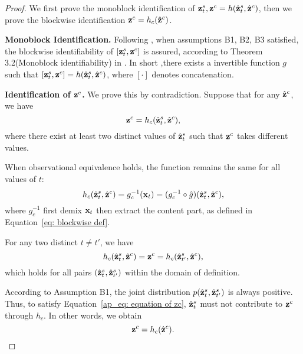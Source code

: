 \begin{proof}

    We first prove the monoblock identification of ${\mathbf{z}}_{t}^s,{\mathbf{z}}^c = h(\hat{{\mathbf{z}}}_{t}^s,\hat{{\mathbf{z}}}^c)$, then we prove the blockwise identification
    ${\mathbf{z}}^c = h_c(\hat{{\mathbf{z}}}^c)$.

    \textbf{Monoblock Identification.} Following \citep{hu2012nonparametric,hu2008instrumental}, when assumptions B1, B2, B3 satisfied, the blockwise identifiability of $[{\mathbf{z}}_{t}^s,{\mathbf{z}}^c]$ is assured, according to Theorem 3.2(Monoblock identifiability) in \citep{fu2025identification}. In short ,there exists a invertible function $g$ such that $[{\mathbf{z}}_{t}^s,{\mathbf{z}}^c] = h(\hat{{\mathbf{z}}}_{t}^s,\hat{{\mathbf{z}}}^c)$, where $[\cdot]$ denotes concatenation.

    \textbf{Identification of ${\mathbf{z}}^c$.}   We prove this by contradiction. Suppose that for any $\hat{{\mathbf{z}}}^c$, we have  
    \begin{equation}
        {\mathbf{z}}^c = h_c(\hat{{\mathbf{z}}}_t^s, \hat{{\mathbf{z}}}^c),
    \end{equation}  
    where there exist at least two distinct values of $\hat{{\mathbf{z}}}_t^s$ such that ${\mathbf{z}}^c$ takes different values.

    
    When observational equivalence holds, the function remains the same for all values of $t$:  
    \begin{equation}
         h_c(\hat{{\mathbf{z}}}_t^s, \hat{{\mathbf{z}}}^c) = g_c^{-1}({\mathbf{x}}_t) = (g_c^{-1} \circ \hat{g})(\hat{{\mathbf{z}}}_t^s, \hat{{\mathbf{z}}}^c),
    \end{equation}  
    where $g_c^{-1}$ first demix ${\mathbf{x}}_t$ then extract the content part, as defined in Equation~\ref{eq: blockwise def}.
    
    For any two distinct $t \neq t'$, we have  
    \begin{equation}
    \label{ap_eq: equation of zc}
          h_c(\hat{{\mathbf{z}}}_{t}^s, \hat{{\mathbf{z}}}^c) = {\mathbf{z}}^c = h_c(\hat{{\mathbf{z}}}_{t'}^s, \hat{{\mathbf{z}}}^c),
    \end{equation}  
    which holds for all pairs $(\hat{{\mathbf{z}}}_{t}^s, \hat{{\mathbf{z}}}_{t'}^s)$ within the domain of definition.  
    
    According to Assumption B1, the joint distribution $p(\hat{{\mathbf{z}}}_{t}^s, \hat{{\mathbf{z}}}_{t'}^s)$ is always positive. Thus, to satisfy Equation~\ref{ap_eq: equation of zc}, $\hat{{\mathbf{z}}}_t^s$ must not contribute to ${\mathbf{z}}^c$ through $h_c$. In other words, we obtain 
    \begin{equation}
    \label{ap_eq: identifiability of zc}
        {\mathbf{z}}^c = h_c(\hat{{\mathbf{z}}}^c).
    \end{equation}  


\end{proof}
